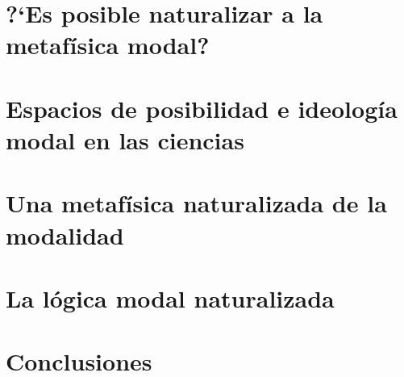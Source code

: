 \documentclass[12pt,letterpaper]{book}
\begin{document}
\chapter{?`Es posible naturalizar a la metafísica modal?}\label{ch:ProyectoNaturalizaciónModalidad}
 
 
 
\chapter{Espacios de posibilidad e ideología modal en las ciencias}\label{chap:EspaciosPosibilidad}
 


\chapter{Una metafísica naturalizada de la modalidad}\label{chap:RAMS}
 


\chapter{La lógica modal naturalizada}\label{ch:LogicaModalNatural}
 


\chapter{Conclusiones}
 


\backmatter


% 




\end{document}
